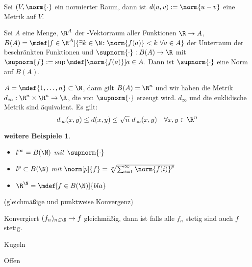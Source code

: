 \begin{stz}
    Sei $(V, \norm{\cdot}$ ein normierter Raum, dann ist $d(u,v) := \norm{u - v}$
    eine Metrik auf $V$.
\end{stz}

\begin{dfn}
    Sei $A$ eine Menge, $\R^A$ der \R-Vektorraum aller Funktionen $\R \to A$,
    $B(A) = \mdef[f\in\R^A]{\exists k\in\N\!: \norm{f(a)} < k \ \forall a \in A}$
    der Unterraum der beschränkten Funktionen und $\supnorm{\cdot}: B(A) \to \R$
    mit $\supnorm{f} := \sup \mdef[\norm{f(a)}]{a\in A}$. Dann ist
    $\supnorm{\cdot}$ eine Norm auf $B(A)$.
\end{dfn}

\begin{bsp}
    $A = \mdef{1,\ldots,n}\subset \N$, dann gilt $B(A) = \R^n$ und wir haben
    die Metrik $d_\infty: \R^n \times \R^n \to \R$, die von $\supnorm{\cdot}$
    erzeugt wird. $d_\infty$ und die euklidische Metrik sind äquivalent.
    Es gilt:
    \[d_\infty(x,y) \le d(x,y) \le \sqrt{n}\ d_\infty(x,y) \quad \forall x,y\in\R^n\]
\end{bsp}

\newtheorem{wbsp}[dfn]{weitere Beispiele}
\begin{wbsp}
    \begin{itemize}
        \item ${l}^\infty = B(\N)$ mit $\supnorm{\cdot}$
        \item ${l}^p \subset B(\N)$ mit
                $\norm[p]{f} = \sqrt[p]{\sum^\infty_{i=1} \norm{f(i)}^p}$
        \item $\R^\N = \mdef[f \in B(\N)]{bla}$
    \end{itemize}
\end{wbsp}

\begin{dfn}
    (gleichmäßige und punktweise Konvergenz)
\end{dfn}

\begin{stz}
    Konvergiert $(f_n)_{n\in\N} \to f$ gleichmäßig, dann ist falls alle $f_n$
    stetig sind auch $f$ stetig.
\end{stz}

\begin{dfn}
    Kugeln
\end{dfn}

\begin{dfn}
    Offen
\end{dfn}

